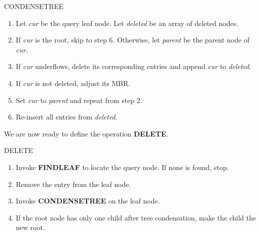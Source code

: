 \documentclass{article}
\begin{document}
\begin{algorithm}{CONDENSETREE \cite{Guttman1984}}
	\begin{enumerate}
		\item Let \textit{cur} be the query leaf node. Let \textit{deleted} be an array of deleted nodes.
		\item If \textit{cur} is the root, skip to step 6. Otherwise, let \textit{parent} be the parent node of \textit{cur}.
		\item If \textit{cur} underflows, delete its corresponding entries and append \textit{cur} to \textit{deleted}.
		\item If \textit{cur} is not deleted, adjust its MBR.
		\item Set \textit{cur} to \textit{parent} and repeat from step 2.
		\item Re-insert all entries from \textit{deleted}.
	\end{enumerate}
\end{algorithm}

We are now ready to define the operation \textbf{DELETE}.
\begin{algorithm}{DELETE \cite{Guttman1984}}
	\begin{enumerate}
		\item Invoke \textbf{FINDLEAF} to locate the query node. If none is found, stop.
		\item Remove the entry from the leaf node.
		\item Invoke \textbf{CONDENSETREE} on the leaf node.
		\item If the root node has only one child after tree condensation, make the child the new root.
	\end{enumerate}
\end{algorithm}
\end{document}
